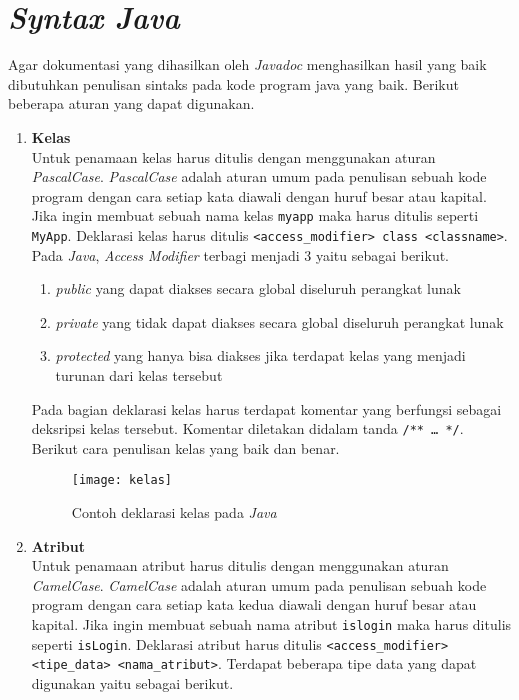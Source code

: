 \section{\textit{Syntax Java}}
\label{sec:syntax-java}

Agar dokumentasi yang dihasilkan oleh {\it Javadoc} menghasilkan hasil yang baik dibutuhkan penulisan sintaks pada kode program java yang baik. Berikut beberapa aturan yang dapat digunakan.

\begin{enumerate}
  \item \textbf{Kelas}\\
  Untuk penamaan kelas harus ditulis dengan menggunakan aturan {\it PascalCase}. {\it PascalCase} adalah aturan umum pada penulisan sebuah kode program dengan cara setiap kata diawali dengan huruf besar atau kapital. Jika ingin membuat sebuah nama kelas {\tt myapp} maka harus ditulis seperti {\tt MyApp}. Deklarasi kelas harus ditulis {\tt <access\_modifier> class <classname>}. Pada {\it Java}, {\it Access Modifier} terbagi menjadi 3 yaitu sebagai berikut.
  \begin{enumerate}
    \item {\it public} yang dapat diakses secara global diseluruh perangkat lunak
    \item {\it private} yang tidak dapat diakses secara global diseluruh perangkat lunak
    \item {\it protected} yang hanya bisa diakses jika terdapat kelas yang menjadi turunan dari kelas tersebut
  \end{enumerate}
  Pada bagian deklarasi kelas harus terdapat komentar yang berfungsi sebagai deksripsi kelas tersebut. Komentar diletakan didalam tanda {\tt /** \dots\ */}. Berikut cara penulisan kelas yang baik dan benar.
	\begin{figure}[H]
	  \centering  
	  \texttt{[image: kelas]}
	  \caption[Contoh deklarasi kelas pada {\it Java}]{Contoh deklarasi kelas pada {\it Java}}
	  \label{fig:kelas} 
    \end{figure}
  \item \textbf{Atribut}\\
  Untuk penamaan atribut harus ditulis dengan menggunakan aturan {\it CamelCase}. {\it CamelCase} adalah aturan umum pada penulisan sebuah kode program dengan cara setiap kata kedua diawali dengan huruf besar atau kapital. Jika ingin membuat sebuah nama atribut {\tt islogin} maka harus ditulis seperti {\tt isLogin}. Deklarasi atribut harus ditulis {\tt <access\_modifier> <tipe\_data> <nama\_atribut>}. Terdapat beberapa tipe data yang dapat digunakan yaitu sebagai berikut.

\end{enumerate}
